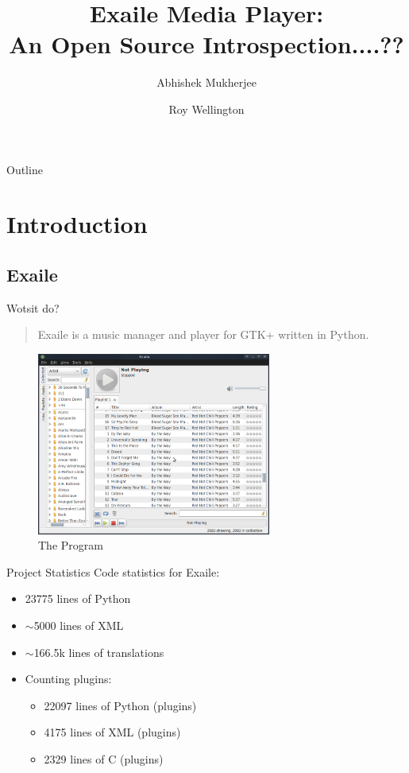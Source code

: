 \documentclass{beamer}
\title
{%
  Exaile Media Player:\\
  An Open Source Introspection....?? %
}
\author
{
  Abhishek Mukherjee \and
  Roy Wellington
}
\begin{document}
\begin{frame}
  \titlepage
\end{frame}

\begin{frame}{Outline}
  \tableofcontents
\end{frame}


\section{Introduction}

\subsection{Exaile}

\begin{frame}{Wotsit do?}
  \begin{quote}
    Exaile is a music manager and player for GTK+ written in Python.
  \end{quote}
  \begin{figure}
    \includegraphics[height=60mm]{images/exaile.png}
    \caption{The Program}
  \end{figure}
\end{frame}

\begin{frame}{Project Statistics}
  Code statistics for Exaile:
  \begin{itemize}
    \item 23775 lines of Python
    \item $\sim$5000 lines of XML
    \item $\sim$166.5k lines of translations
	\item Counting plugins:
	\begin{itemize}
      \item 22097 lines of Python (plugins)
      \item 4175 lines of XML (plugins)
      \item 2329 lines of C (plugins)
	\end{itemize}
  \end{itemize}
\end{frame}
\end{document}
